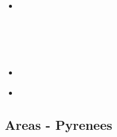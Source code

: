 \begin{scriptsize}
\begin{itemize}
\textcite{livn20} \\
\textcite{chlc20} \\
\textcite{pust20} \\
\textcite{yakl20} \\
\textcite{ghbm20} \\
\textcite{sigh20} \\
\textcite{capi20} \\
\item[\twothousandtwentyone] 
\textcite{famu21} \\
\textcite{pels21} \\
\textcite{pirc21} \\
\textcite{cull21} \\
\textcite{mars21} \\
\item[\twothousandtwentytwo] 
\textcite{wawf22} \\
\item[\twothousandtwentythree] 
\textcite{lass23} \\
\end{itemize}
\end{scriptsize}

\subsection{Areas - Pyrenees} 

